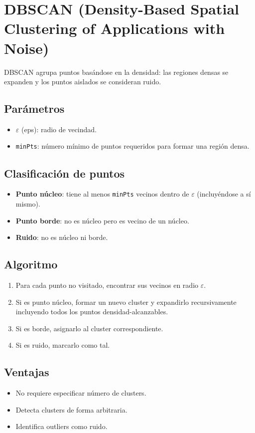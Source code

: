 \documentclass[12pt,a4paper,openany,oneside]{book}
\begin{document}
\section{DBSCAN (Density-Based Spatial Clustering of Applications with Noise)}

DBSCAN agrupa puntos basándose en la densidad: las regiones densas se expanden y los puntos aislados se consideran ruido.

\subsection{Parámetros}
\begin{itemize}
    \item \(\varepsilon\) (eps): radio de vecindad.
    \item \texttt{minPts}: número mínimo de puntos requeridos para formar una región densa.
\end{itemize}

\subsection{Clasificación de puntos}
\begin{itemize}
    \item \textbf{Punto núcleo}: tiene al menos \texttt{minPts} vecinos dentro de \(\varepsilon\) (incluyéndose a sí mismo).
    \item \textbf{Punto borde}: no es núcleo pero es vecino de un núcleo.
    \item \textbf{Ruido}: no es núcleo ni borde.
\end{itemize}

\subsection{Algoritmo}
\begin{enumerate}
    \item Para cada punto no visitado, encontrar sus vecinos en radio \(\varepsilon\).
    \item Si es punto núcleo, formar un nuevo cluster y expandirlo recursivamente incluyendo todos los puntos densidad-alcanzables.
    \item Si es borde, asignarlo al cluster correspondiente.
    \item Si es ruido, marcarlo como tal.
\end{enumerate}

\subsection{Ventajas}
\begin{itemize}
    \item No requiere especificar número de clusters.
    \item Detecta clusters de forma arbitraria.
    \item Identifica outliers como ruido.
\end{itemize}
\end{document}
